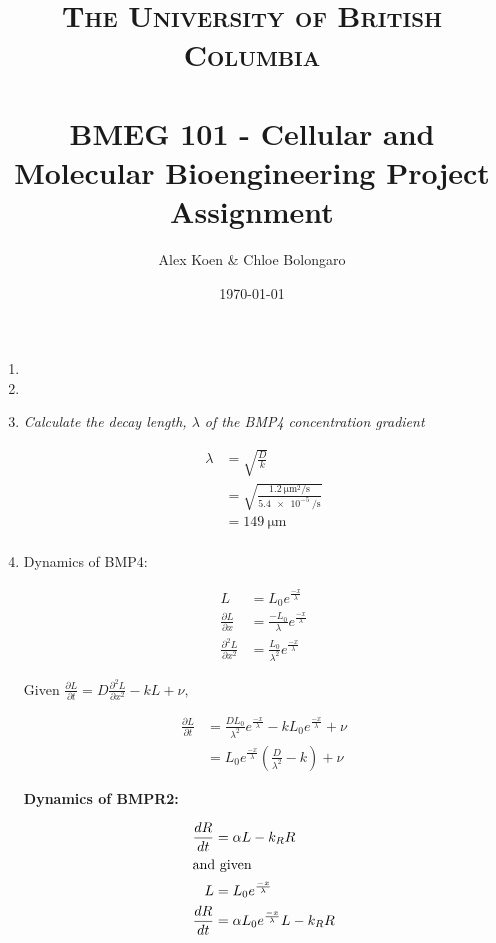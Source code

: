 \documentclass{article} %
\title{
  \normalfont \normalsize
  \textsc{The University of British Columbia} \\ [25pt] %
  \horrule{0.5pt} \\[0.4cm] %
  \huge BMEG 101 - Cellular and Molecular Bioengineering Project Assignment %
  \horrule{2pt} \\[0.5cm] %
}
\author{Alex Koen \& Chloe Bolongaro} %
\date{\normalsize \today} %
\begin{document}
\maketitle %

\onehalfspacing

\begin{enumerate}
    \item 
    \item 
    \item \textit{Calculate the decay length, $\lambda$ of the BMP4 concentration gradient}
    
    \begin{align*}
        \lambda &= \sqrt{\frac{D}{k}} \\
        &= \sqrt{\frac{\SI{1.2}{\micro\m^2\per\s}}{\SI{5.4e-5}{\per\s}}} \\
        &= \SI{149}{\micro\m} \\
    \end{align*}
    \item Dynamics of BMP4:
    
    \begin{align*}
        L &= L_0 e^{\frac{-x}{\lambda}} \\
        \frac{\partial L}{\partial x} &= \frac{-L_0}{\lambda}e^{\frac{-x}{\lambda}} \\
        \frac{\partial ^2L}{\partial x^2} &= \frac{L_0}{\lambda^2}e^{\frac{-x}{\lambda}}
    \end{align*}
    
    Given $\frac{\partial L }{\partial t} = D\frac{\partial^2 L}{\partial x^2}-kL+\nu,$
    
    \begin{align*}
        \frac{\partial L}{\partial t} &= \frac{DL_0}{\lambda^2}e^{\frac{-x}{\lambda}}-kL_0e^{\frac{-x}{\lambda}} + \nu \\
        &= L_0e^{\frac{-x}{\lambda}}\left(\frac{D}{\lambda^2} -k \right) + \nu
    \end{align*}
    
    \textbf{Dynamics of BMPR2:}

    \begin{align*}
    \frac{dR}{dt} &= \alpha L-k_R R \\
      \intertext{and given}
      L &= L_0 e^{\frac{-x}{\lambda}} \\
    \frac{dR}{dt} &= \alpha L_0 e^{\frac{-x}{\lambda}} L-k_R R \\
    \end{align*}


\end{enumerate}
\end{document}
